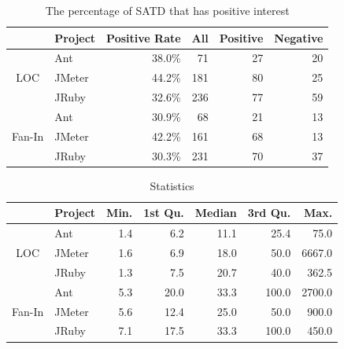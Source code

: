 \begin{table}[tb]
  \caption{The percentage of SATD that has positive interest}
  \label{tab:percentage}
  \centering

  \begin{tabular}{cl|r|rrr}
  \hline
      &  Project & Positive Rate & All & Positive & Negative \\
  \hline
        & Ant    & 38.0\% &  71 &  27  &  20 \\
   LOC  & JMeter & 44.2\% & 181 &  80  &  25 \\
        & JRuby  & 32.6\% & 236 &  77  &  59 \\
  \hline
        & Ant    & 30.9\% &  68 &  21  &  13 \\
Fan-In  & JMeter & 42.2\% & 161 &  68  &  13 \\
        & JRuby  & 30.3\% & 231 &  70  &  37 \\
  \hline
  \end{tabular}
\end{table}

\begin{table}[tb]
  \caption{Statistics}
  \label{tab:statistic}
  \centering

  \begin{tabular}{cl|rrrrr}
  \hline
      &  Project & Min. & 1st Qu. & Median & 3rd Qu. & Max. \\
  \hline
        & Ant    & 1.4 &   6.2 &  11.1  &   25.4 &   75.0 \\
   LOC  & JMeter & 1.6 &   6.9 &  18.0  &   50.0 & 6667.0 \\
        & JRuby  & 1.3 &   7.5 &  20.7  &   40.0 &  362.5 \\
  \hline
        & Ant    & 5.3 &  20.0 &  33.3  &  100.0 & 2700.0 \\
Fan-In  & JMeter & 5.6 &  12.4 &  25.0  &   50.0 &  900.0 \\
        & JRuby  & 7.1 &  17.5 &  33.3  &  100.0 &  450.0 \\
  \hline
  \end{tabular}
\end{table}

